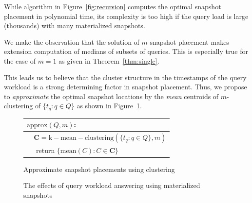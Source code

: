 While algorithm in Figure~\ref{fig:recursion} computes the optimal snapshot
placement in polynomial time, its complexity is too high if the query load is
large (thousands) with many materialized snapshots.

We make the observation that the solution of $m$-snapshot placement makes
extension computation of medians of subsets of queries.  This is especially true
for the case of $m=1$ as given in Theorem~\ref{thm:single}.

This leads us to believe that the cluster structure in the timestamps of the
query workload is a strong determining factor in snapshot placement.  Thus, we
propose to {\em approximate} the optimal snapshot locations by the {\em mean}
centroids of $m$-clustering of $\{t_q : q\in Q\}$ as shown in
Figure~\ref{fig:approx}.

\begin{figure}[htbp]
    \centering
    \begin{tabular}{l}\hline\hline
        $\mathrm{approx}(Q, m)$: \\ \hline
        \verb|  | $\mathbf{C} = \mathrm{k-mean-clustering}(\{t_q: q\in Q\}, m)$ \\
        \verb|  | return $\{\mathrm{mean}(C) : C\in\mathbf{C}\}$ \\ \hline\hline
    \end{tabular}
    \caption{Approximate snapshot placements using clustering}
    \label{fig:approx}
\end{figure}
\begin{figure}[b] 
    \centering 
    \hfill 
    \hfill
    \caption{The effects of query workload answering using materialized snapshots}
    \label{fig:query-answer}
\end{figure}


